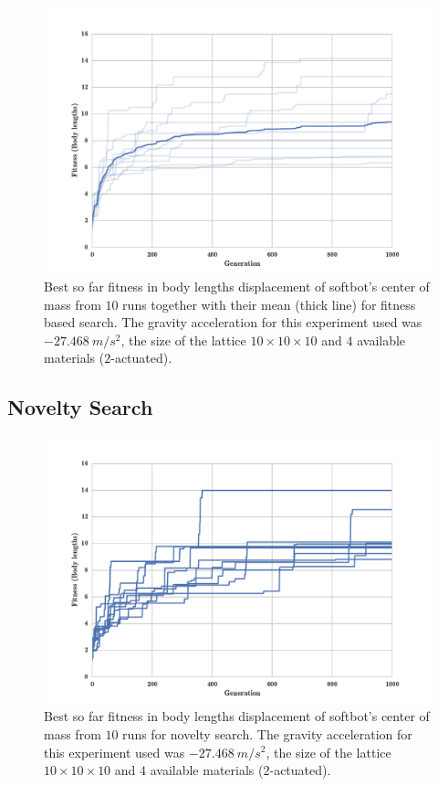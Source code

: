 \begin{figure}[h!]
\centering
\includegraphics[width=1.0\textwidth]{../Figures/Results/indRunsAvgSize10Fitness.pdf}
\caption{Best so far fitness in body lengths displacement of softbot's center of mass from $10$ runs together with their mean (thick line) for fitness based search. The gravity acceleration for this experiment used was $-27.468\   m/s^2$, the size of the lattice $10\times 10\times10$ and $4$ available materials ($2$-actuated).}
\label{fig:indRunsAvgSize10Fitness}
\end{figure}

\clearpage
\subsection{Novelty Search}

\begin{figure}[h!]
\centering
\includegraphics[width=1.0\textwidth]{../Figures/Results/indRunsSize10Novelty.pdf}
\caption{Best so far fitness in body lengths displacement of softbot's center of mass from $10$ runs for novelty search. The gravity acceleration for this experiment used was $-27.468\   m/s^2$, the size of the lattice $10\times 10\times10$ and $4$ available materials ($2$-actuated).}
\label{fig:indRunsSize10Novelty}
\end{figure}

